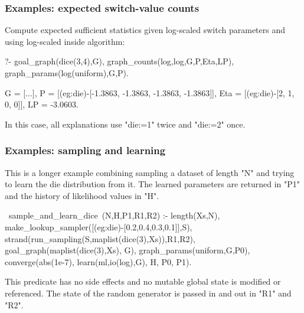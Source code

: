 \documentclass[usenames,dvipsnames]{beamer}
\newenvironment{isframe}[1][untitled]{\begin{frame}[fragile=singleslide,environment=isframe]\frametitle{#1}}{\end{frame}}
\begin{document}
\begin{isframe}[Examples: expected switch-value counts]
Compute expected sufficient statistics given log-scaled switch parameters
and using log-scaled inside algorithm:
\begin{prolog-barred}
  ?- goal_graph(dice(3,4),G), 
     graph_counts(log,log,G,P,Eta,LP), 
     graph_params(log(uniform),G,P).

  G = [...],
  P = [(eg:die)-[-1.3863, -1.3863, -1.3863, -1.3863]],
  Eta = [(eg:die)-[2, 1, 0, 0]],
  LP = -3.0603.
\end{prolog-barred}
In this case, all explanations use "die:=1" twice and "die:=2" once.
\end{isframe}

\begin{isframe}[Examples: sampling and learning]
This is a longer example combining sampling a dataset of 
length "N" and trying to learn the die distribution from it. 
The learned parameters are returned in "P1" and the history
of likelihood values in "H".
\begin{prolog}[xleftmargin=0em,basicstyle=\small]
  ~sample_and_learn_dice~(N,H,P1,R1,R2) :-
    length(Xs,N),
    make_lookup_sampler([(eg:die)-[0.2,0.4,0.3,0.1]],S),
    strand(run_sampling(S,maplist(dice(3),Xs)),R1,R2),
    goal_graph(maplist(dice(3),Xs), G),
    graph_params(uniform,G,P0),
    converge(abs(1e-7), learn(ml,io(log),G), H, P0, P1).
\end{prolog}
This predicate has no side effects and no mutable
global state is modified or referenced. The state of the
random generator is passed in and out in "R1" and "R2".
\end{isframe}
\end{document}
